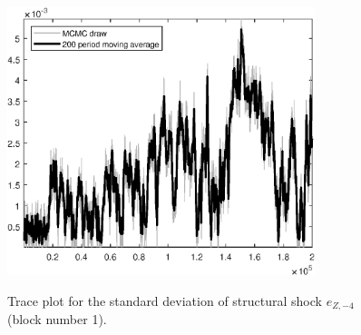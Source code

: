 \begin{figure}[H]
\centering
  \includegraphics[width=0.8\textwidth]{BRS_sectoral_rest/graphs/TracePlot_SE_e_Z_news_blck_1}\\
    \caption{Trace plot for the standard deviation of structural shock ${e_{Z,-4}}$ (block number 1).}
\end{figure}
